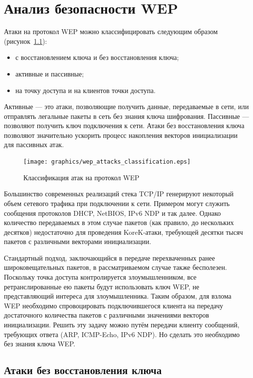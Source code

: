 \chapter{Анализ безопасности WEP}

Атаки на протокол WEP можно классифицировать следующим образом
(рисунок~\ref{fig:wep_attacks_classification}):

\begin{itemize}
    \item с восстановлением ключа и без восстановления ключа;
    \item активные и пассивные;
    \item на точку доступа и на клиентов точки доступа.
\end{itemize}

Активные --- это атаки, позволяющие получить данные, передаваемые в сети, или
отправлять легальные пакеты в сеть без знания ключа шифрования.  Пассивные ---
позволяют получить ключ подключения к сети. Атаки без восстановления ключа
позволяют значительно ускорить процесс накопления векторов инициализации для
пассивных атак.

\begin{figure}
    \texttt{[image: graphics/wep\_attacks\_classification.eps]}
    \caption{Классификация атак на протокол WEP}
    \label{fig:wep_attacks_classification}
\end{figure}

Большинство современных реализаций стека TCP/IP генерируют некоторый объем
сетевого трафика при подключении к сети. Примером могут служить сообщения
протоколов DHCP, NetBIOS, IPv6 NDP и так далее. Однако количество передаваемых в
этом случае пакетов (как правило, до нескольких десятков) недостаточно для
проведения KoreK-атаки, требующей десятки тысяч пакетов с различными векторами
инициализации.

Стандартный подход, заключающийся в передаче перехваченных ранее
широковещательных пакетов, в рассматриваемом случае также бесполезен. Поскольку
точка доступа контролируется злоумышленником, все ретранслированные ею пакеты
будут использовать ключ WEP, не представляющий интереса для злоумышленника.
Таким образом, для взлома WEP необходимо спровоцировать подключившегося клиента
на передачу достаточного количества пакетов с различными значениями векторов
инициализации. Решить эту задачу можно путём передачи клиенту сообщений,
требующих ответа (ARP, ICMP-Echo, IPv6 NDP). Но сделать это необходимо без
знания ключа WEP.


\section{Атаки без восстановления ключа}

